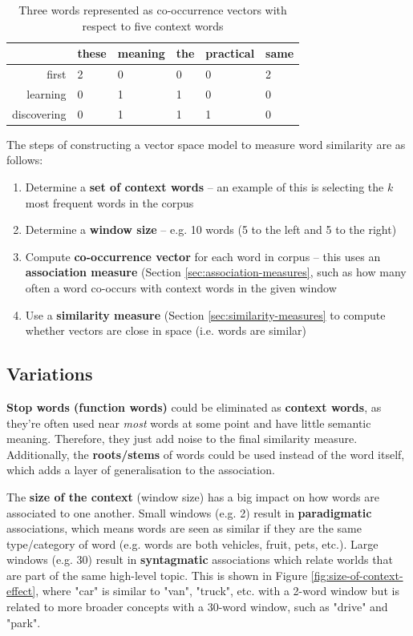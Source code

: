 \documentclass{article}
\begin{document}
\begin{table}[H]
	\centering
	\begin{tabular}{|r|l|l|l|l|l|}
		\hline
		& these & meaning & the & practical & same \\
		\hline
		first & 2 & 0 & 0 & 0 & 2 \\
		learning & 0 & 1 & 1 & 0 & 0 \\
		discovering & 0 & 1 & 1 & 1 & 0 \\
		\hline
	\end{tabular}
	\caption{Three words represented as co-occurrence vectors with respect to five context words}
	\label{tab:vsm-co-occurrence-vectors}
\end{table}

The steps of constructing a vector space model to measure word similarity are as follows:
\begin{enumerate}
	\item Determine a \textbf{set of context words} -- an example of this is selecting the $k$ most frequent words in the corpus
	\item Determine a \textbf{window size} -- e.g. 10 words (5 to the left and 5 to the right)
	\item Compute \textbf{co-occurrence vector} for each word in corpus -- this uses an \textbf{association measure} (Section \ref{sec:association-measures}, such as how many often a word co-occurs with context words in the given window
	\item Use a \textbf{similarity measure} (Section \ref{sec:similarity-measures} to compute whether vectors are close in space (i.e. words are similar)
\end{enumerate}

\subsection{Variations}

\textbf{Stop words (function words)} could be eliminated as \textbf{context words}, as they're often used near \textit{most} words at some point and have little semantic meaning. Therefore, they just add noise to the final similarity measure. Additionally, the \textbf{roots/stems} of words could be used instead of the word itself, which adds a layer of generalisation to the association.

The \textbf{size of the context} (window size) has a big impact on how words are associated to one another. Small windows (e.g. 2) result in \textbf{paradigmatic} associations, which means words are seen as similar if they are the same type/category of word (e.g. words are both vehicles, fruit, pets, etc.). Large windows (e.g. 30) result in \textbf{syntagmatic} associations which relate worlds that are part of the same high-level topic. This is shown in Figure \ref{fig:size-of-context-effect}, where "car" is similar to "van", "truck", etc. with a 2-word window but is related to more broader concepts with a 30-word window, such as "drive" and "park".
\end{document}
